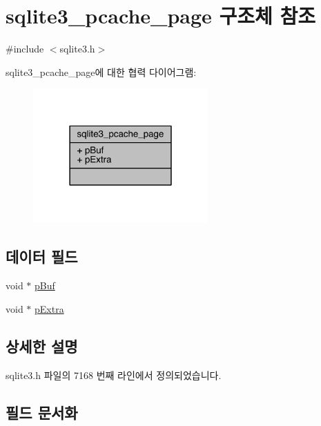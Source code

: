 \hypertarget{structsqlite3__pcache__page}{}\section{sqlite3\+\_\+pcache\+\_\+page 구조체 참조}
\label{structsqlite3__pcache__page}


{\ttfamily \#include $<$sqlite3.\+h$>$}



sqlite3\+\_\+pcache\+\_\+page에 대한 협력 다이어그램\+:
\nopagebreak
\begin{figure}[H]
\begin{center}
\leavevmode
\includegraphics[width=190pt]{d2/dde/structsqlite3__pcache__page__coll__graph}
\end{center}
\end{figure}
\subsection*{데이터 필드}
\begin{DoxyCompactItemize}
\item 
void $\ast$ \hyperlink{structsqlite3__pcache__page_a19aa6f5638fe2d4eee32aed37a119288}{p\+Buf}
\item 
void $\ast$ \hyperlink{structsqlite3__pcache__page_a6356a15fc426a7558ddf34038f70a65f}{p\+Extra}
\end{DoxyCompactItemize}


\subsection{상세한 설명}


sqlite3.\+h 파일의 7168 번째 라인에서 정의되었습니다.



\subsection{필드 문서화}
\mbox{\label{structsqlite3__pcache__page_a19aa6f5638fe2d4eee32aed37a119288}} 
